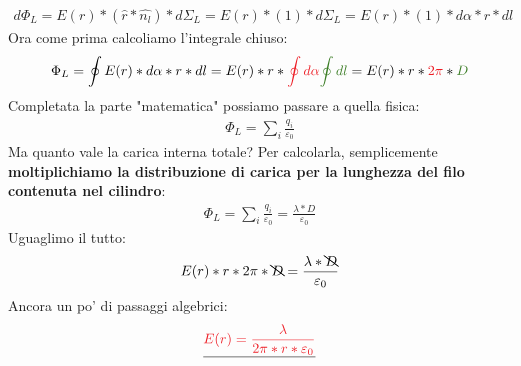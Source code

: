                     \begin{align*}
                        d\Phi_{L} = E(r)*(\hat{r}*\hat{n_l})*d\Sigma_L = E(r)*(1)*d\Sigma_L = E(r)*(1)*d\alpha*r*dl
                    \end{align*}
                    Ora come prima calcoliamo l'integrale chiuso:
                    \begin{align*}
                        \Phi_{L} = \oint E(r)*d\alpha*r*dl = E(r)*r*\textcolor{Red}{\oint d\alpha}\textcolor{OliveGreen}{\oint dl} = E(r)*r*\textcolor{Red}{2\pi}*\textcolor{OliveGreen}{D}
                    \end{align*}
                    Completata la parte "matematica" possiamo passare a quella fisica:
                    \begin{align*}
                        \Phi_{L} = \sum_i\frac{q_i}{\varepsilon_0}
                    \end{align*}
                    Ma quanto vale la carica interna totale? Per calcolarla, semplicemente \textbf{moltiplichiamo la distribuzione di carica per la lunghezza del filo contenuta nel cilindro}:
                    \begin{align*}
                        \Phi_{L} = \sum_i\frac{q_i}{\varepsilon_0}=\frac{\lambda*D}{\varepsilon_0}
                    \end{align*}
                    Uguaglimo il tutto:
                    \begin{align*}
                        E(r)*r*2\pi*\bcancel{D} = \frac{\lambda*\bcancel{D}}{\varepsilon_0}
                    \end{align*}
                    Ancora un po' di passaggi algebrici:
                    \begin{align*}
                       \underline{\textcolor{Red}{E(r) = \frac{\lambda}{2\pi*r*\varepsilon_0}}}
                    \end{align*}
